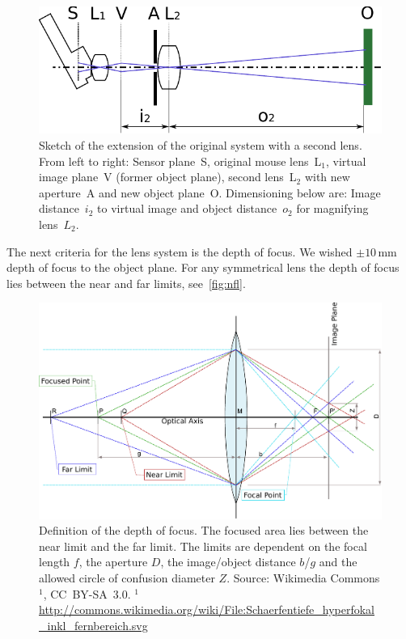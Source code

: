 \documentclass[12pt,a4paper]{article}
\begin{document}
\begin{figure}[htbp]
\begin{center}
\includegraphics[width=1\columnwidth]{figures/sketch-optic-2lens}
\caption{\label{fig:sk2l}
Sketch of the extension of the original system with a second lens.
From left to right: 
Sensor plane~S,
original mouse lens~L$_1$, 
virtual image plane~V (former object plane),
second lens~L$_2$ with new aperture~A and
new object plane~O.
Dimensioning below are: 
Image distance~$i_2$ to virtual image and object distance~$o_2$ for magnifying lens~$L_2$. %
}
\end{center}
\end{figure}

The next criteria for the lens system is the depth of focus.
We wished $\pm 10$\,mm depth of focus to the object plane.
For any symmetrical lens the depth of focus lies between the near and far limits, see~\autoref{fig:nfl}.

\begin{figure}[htbp]
\includegraphics[width=1\columnwidth]{figures/near_farpoints}
\caption{\label{fig:nfl}
Definition of the depth of focus.
The focused area lies between the near limit and the far limit.
The limits are dependent on the focal length $f$, the aperture $D$, the image/object distance $b$/$g$ and the allowed circle of confusion diameter $Z$.
\newline
Source: Wikimedia Commons$^1$, CC~BY-SA~3.0.
\newline
\newline
$^1$ \url{http://commons.wikimedia.org/wiki/File:Schaerfentiefe_hyperfokal_inkl_fernbereich.svg}
}
\end{figure}
\end{document}
